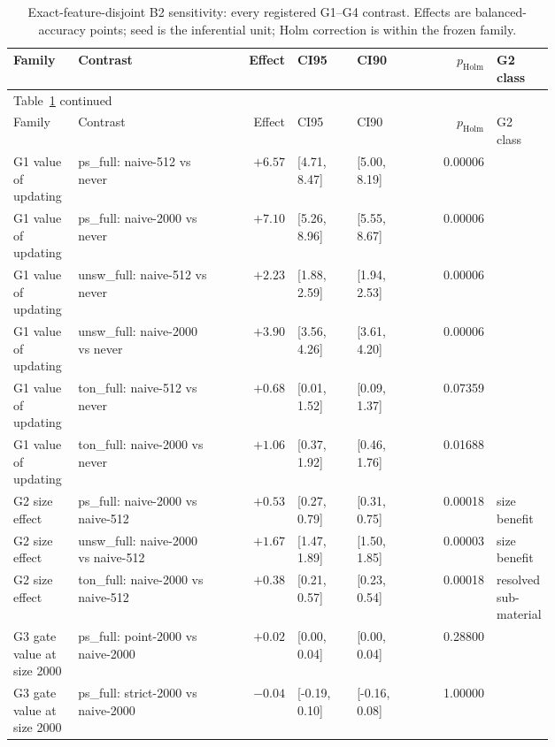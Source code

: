 {\scriptsize
\setlength{\tabcolsep}{2pt}
\renewcommand{\arraystretch}{1.08}
\begin{longtable}{p{0.12\linewidth} p{0.27\linewidth} r p{0.11\linewidth} p{0.11\linewidth} r p{0.10\linewidth}}
\caption{Exact-feature-disjoint B2 sensitivity: every registered G1--G4 contrast.
Effects are balanced-accuracy points; seed is the inferential unit; Holm correction is
within the frozen family.}\label{tab:value_disjoint_b2_supp}\\
\toprule
Family & Contrast & Effect & CI95 & CI90 & $p_{\mathrm{Holm}}$ & G2 class \\
\midrule
\endfirsthead
\multicolumn{7}{l}{\small Table~\ref{tab:value_disjoint_b2_supp} continued}\\
\toprule
Family & Contrast & Effect & CI95 & CI90 & $p_{\mathrm{Holm}}$ & G2 class \\
\midrule
\endhead
G1 value of updating & ps\_full: naive-512 vs never & $+6.57$ & [4.71, 8.47] & [5.00, 8.19] & 0.00006 &  \\
G1 value of updating & ps\_full: naive-2000 vs never & $+7.10$ & [5.26, 8.96] & [5.55, 8.67] & 0.00006 &  \\
G1 value of updating & unsw\_full: naive-512 vs never & $+2.23$ & [1.88, 2.59] & [1.94, 2.53] & 0.00006 &  \\
G1 value of updating & unsw\_full: naive-2000 vs never & $+3.90$ & [3.56, 4.26] & [3.61, 4.20] & 0.00006 &  \\
G1 value of updating & ton\_full: naive-512 vs never & $+0.68$ & [0.01, 1.52] & [0.09, 1.37] & 0.07359 &  \\
G1 value of updating & ton\_full: naive-2000 vs never & $+1.06$ & [0.37, 1.92] & [0.46, 1.76] & 0.01688 &  \\
G2 size effect & ps\_full: naive-2000 vs naive-512 & $+0.53$ & [0.27, 0.79] & [0.31, 0.75] & 0.00018 & size benefit \\
G2 size effect & unsw\_full: naive-2000 vs naive-512 & $+1.67$ & [1.47, 1.89] & [1.50, 1.85] & 0.00003 & size benefit \\
G2 size effect & ton\_full: naive-2000 vs naive-512 & $+0.38$ & [0.21, 0.57] & [0.23, 0.54] & 0.00018 & resolved sub-material \\
G3 gate value at size 2000 & ps\_full: point-2000 vs naive-2000 & $+0.02$ & [0.00, 0.04] & [0.00, 0.04] & 0.28800 &  \\
G3 gate value at size 2000 & ps\_full: strict-2000 vs naive-2000 & $-0.04$ & [-0.19, 0.10] & [-0.16, 0.08] & 1.00000 &  \\

\end{longtable}}
